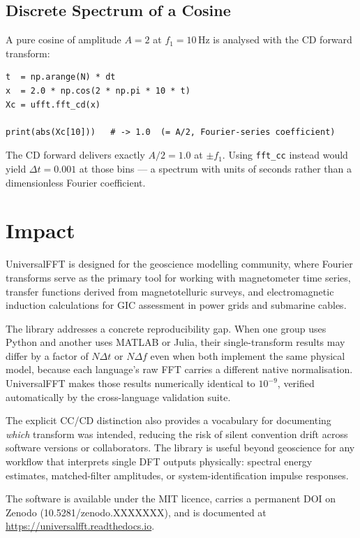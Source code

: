 \documentclass[12pt,a4paper]{article}
\begin{document}
\subsection{Discrete Spectrum of a Cosine}

A pure cosine of amplitude $A = 2$ at $f_1 = 10$\,Hz is analysed with the CD
forward transform:

\begin{lstlisting}[style=pycode]
t  = np.arange(N) * dt
x  = 2.0 * np.cos(2 * np.pi * 10 * t)
Xc = ufft.fft_cd(x)

print(abs(Xc[10]))   # -> 1.0  (= A/2, Fourier-series coefficient)
\end{lstlisting}

The CD forward delivers exactly $A/2 = 1.0$ at $\pm f_1$. Using \texttt{fft\_cc}
instead would yield $\Delta t = 0.001$ at those bins --- a spectrum with units of
seconds rather than a dimensionless Fourier coefficient.

\section{Impact}

UniversalFFT is designed for the geoscience modelling community, where Fourier
transforms serve as the primary tool for working with magnetometer time series,
transfer functions derived from magnetotelluric surveys, and electromagnetic
induction calculations for GIC assessment in power grids and submarine cables.

The library addresses a concrete reproducibility gap. When one group uses Python
and another uses MATLAB or Julia, their single-transform results may differ by a
factor of $N\Delta t$ or $N\Delta f$ even when both implement the same physical
model, because each language's raw FFT carries a different native normalisation.
UniversalFFT makes those results numerically identical to $10^{-9}$, verified
automatically by the cross-language validation suite.

The explicit CC/CD distinction also provides a vocabulary for documenting
\emph{which} transform was intended, reducing the risk of silent convention drift
across software versions or collaborators. The library is useful beyond geoscience
for any workflow that interprets single DFT outputs physically: spectral energy
estimates, matched-filter amplitudes, or system-identification impulse responses.

The software is available under the MIT licence, carries a permanent DOI on Zenodo
(10.5281/zenodo.XXXXXXX), and is documented at
\url{https://universalfft.readthedocs.io}.
\end{document}
